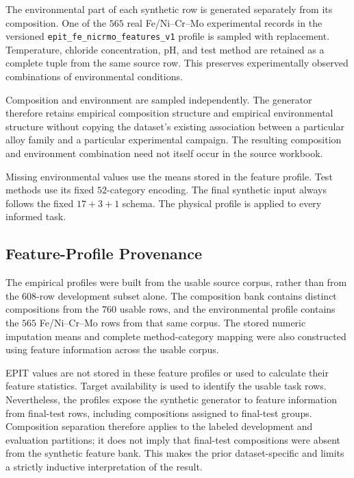 \documentclass{article}
\begin{document}
The environmental part of each synthetic row is generated separately from its
composition. One of the \(565\) real Fe/Ni--Cr--Mo experimental records in the
versioned \texttt{epit\_fe\_nicrmo\_features\_v1} profile is sampled with
replacement. Temperature, chloride concentration, pH, and test method are
retained as a complete tuple from the same source row. This preserves
experimentally observed combinations of environmental conditions.

Composition and environment are sampled independently. The generator therefore
retains empirical composition structure and empirical environmental structure
without copying the dataset's existing association between a particular alloy
family and a particular experimental campaign. The resulting composition and
environment combination need not itself occur in the source workbook.

Missing environmental values use the means stored in the feature profile.
Test methods use its fixed \(52\)-category encoding. The final synthetic input
always follows the fixed \(17+3+1\) schema. The physical profile is applied to
every informed task.

\subsection{Feature-Profile Provenance}
\label{sec:feature-profile-provenance}

The empirical profiles were built from the usable source corpus, rather than
from the \(608\)-row development subset alone. The composition bank contains
distinct compositions from the \(760\) usable rows, and the environmental
profile contains the \(565\) Fe/Ni--Cr--Mo rows from that same corpus. The
stored numeric imputation means and complete method-category mapping were also
constructed using feature information across the usable corpus.

EPIT values are not stored in these feature profiles or used to calculate
their feature statistics. Target availability is used to identify the usable
task rows. Nevertheless, the profiles expose the synthetic generator to
feature information from final-test rows, including compositions assigned to
final-test groups. Composition separation therefore applies to the labeled
development and evaluation partitions; it does not imply that final-test
compositions were absent from the synthetic feature bank. This makes the prior
dataset-specific and limits a strictly inductive interpretation of the result.
\end{document}
